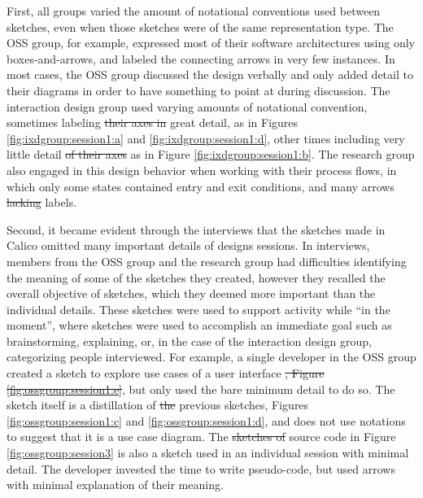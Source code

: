 \documentclass[12pt,fleqn]{ucithesis}
\providecommand{\DIFaddtex}[1]{{\protect\color{blue}\uwave{#1}}} %
\providecommand{\DIFdeltex}[1]{{\protect\color{red}\sout{#1}}}                      %
\providecommand{\DIFaddbegin}{} %
\providecommand{\DIFaddend}{} %
\providecommand{\DIFdelbegin}{} %
\providecommand{\DIFdelend}{} %
\providecommand{\DIFadd}[1]{\texorpdfstring{\DIFaddtex{#1}}{#1}} %
\providecommand{\DIFdel}[1]{\texorpdfstring{\DIFdeltex{#1}}{}} %
\begin{document}
First, all groups varied the amount of notational conventions used between sketches, even when those sketches were of the same representation type. The OSS group, for example, expressed most of their software architectures using only boxes-and-arrows, and labeled the connecting arrows in very few instances. In most cases, the OSS group discussed the design verbally and only added detail to their diagrams in order to have something to point at during discussion. The interaction design group used varying amounts of notational convention, sometimes labeling \DIFdelbegin \DIFdel{their axes in }\DIFdelend \DIFaddbegin \DIFadd{the axes in their plots in }\DIFaddend great detail, as in Figures \ref{fig:ixdgroup:session1:a} and \ref{fig:ixdgroup:session1:d}, other times including very little detail \DIFdelbegin \DIFdel{of their axes }\DIFdelend as in Figure \ref{fig:ixdgroup:session1:b}. The research group also engaged in this design behavior when working with their process flows, in which only some states contained entry and exit conditions, and many arrows \DIFdelbegin \DIFdel{lacking }\DIFdelend \DIFaddbegin \DIFadd{lacked }\DIFaddend labels. 

Second, it became evident through the interviews that the sketches made in Calico omitted many important details of designs sessions. In interviews, members from the OSS group and the research group had difficulties identifying the meaning of some of the sketches they created, however they recalled the overall objective of \DIFaddbegin \DIFadd{the }\DIFaddend sketches, which they deemed more important than the individual details. These sketches were used to support activity while ``in the moment'', where sketches were used to accomplish an immediate goal such as brainstorming, explaining, or, in the case of the interaction design group, categorizing people interviewed. For example, a single developer in the OSS group created a sketch to explore use cases of a user interface \DIFdelbegin \DIFdel{, Figure \ref{fig:ossgroup:session1:e}}\DIFdelend \DIFaddbegin \DIFadd{(Figure \ref{fig:ossgroup:session1:e})}\DIFaddend , but only used the bare minimum detail to do so. The sketch itself is a distillation of \DIFdelbegin \DIFdel{the }\DIFdelend previous sketches, Figures \ref{fig:ossgroup:session1:c} and \ref{fig:ossgroup:session1:d}, and does not use notations to suggest that it is a use case diagram. The \DIFdelbegin \DIFdel{sketches of }\DIFdelend source code in Figure \ref{fig:ossgroup:session3} is also a sketch used in an individual session with minimal detail. The developer invested the time to write pseudo-code, but used arrows with minimal explanation of their meaning. 
\end{document}
